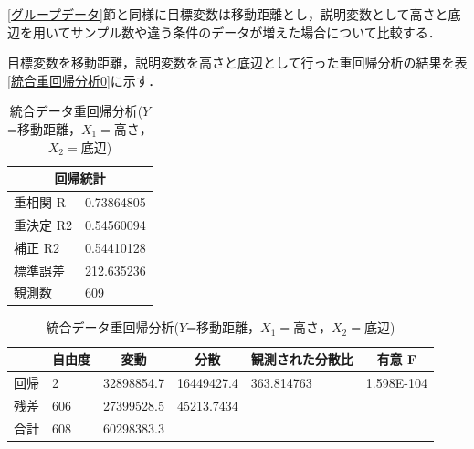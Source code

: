 \documentclass[titlepage,a4paper]{jsarticle}
\begin{document}
\ref{グループデータ}節と同様に目標変数は移動距離とし，説明変数として高さと底辺を用いてサンプル数や違う条件のデータが増えた場合について比較する．

目標変数を移動距離，説明変数を高さと底辺として行った重回帰分析の結果を表\ref{統合重回帰分析0}に示す．

\begin{table}[H]%
  \centering
  \caption{統合データ重回帰分析($Y$=移動距離，$X_{1}=$高さ，$X_{2}=$底辺)}
  \label{統合重回帰分析0}
  \begin{minipage}[c]{0.5\hsize}
    \centering
    \label{sub1統合回帰統計0}
    \begin{tabular}{l|l}
      \multicolumn{2}{c}{回帰統計} \\\hline\hline
      重相関 R  & 0.73864805      \\
      重決定 R2 & 0.54560094      \\
      補正 R2  & 0.54410128      \\
      標準誤差   & 212.635236      \\
      観測数    & 609             \\\hline
    \end{tabular}
  \end{minipage}
  \begin{minipage}[c]{1\hsize}
    \centering
    \label{sub1統合分析0}
    \begin{tabular}{l|lllll}
      \multicolumn{1}{c|}{} & \multicolumn{1}{c}{自由度} & \multicolumn{1}{c}{変動} & \multicolumn{1}{c}{分散} & \multicolumn{1}{c}{観測された分散比} & \multicolumn{1}{c}{有意 F} \\\hline\hline
      回帰                    & 2                       & 32898854.7             & 16449427.4             & 363.814763                   & 1.598E-104               \\
      残差                    & 606                     & 27399528.5             & 45213.7434             &                              &                          \\
      合計                    & 608                     & 60298383.3             &                        &                              &                          \\\hline
    \end{tabular}
  \end{minipage}
  \begin{minipage}[c]{1\hsize}
    \centering

\end{minipage}
\end{table}
\end{document}
